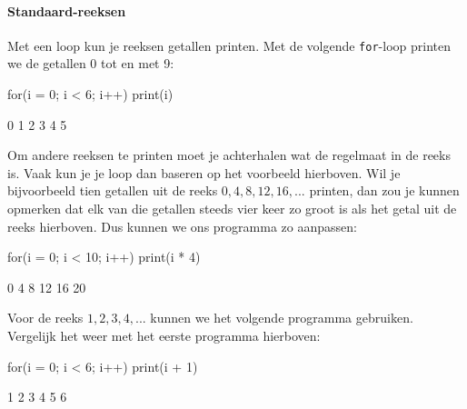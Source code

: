 \paragraph{Standaard-reeksen}

Met een loop kun je reeksen getallen printen. Met de volgende \texttt{for}-loop printen we de getallen 0 tot en met 9:

\begin{minipage}[t]{0.5\textwidth}
\begin{nllisting}
for(i = 0; i < 6; i++)
    print(i)
\end{nllisting}
\end{minipage}%
\begin{minipage}[t]{0.5\textwidth}
\begin{bklisting}
0
1
2
3
4
5
\end{bklisting}
\end{minipage}

Om andere reeksen te printen moet je achterhalen wat de regelmaat in de reeks is. Vaak kun je je loop dan baseren op het voorbeeld hierboven. Wil je bijvoorbeeld tien getallen uit de reeks $0, 4, 8, 12, 16, ...$ printen, dan zou je kunnen opmerken dat elk van die getallen steeds vier keer zo groot is als het getal uit de reeks hierboven. Dus kunnen we ons programma zo aanpassen:

\begin{minipage}[t]{0.5\textwidth}
\begin{nllisting}
for(i = 0; i < 10; i++)
    print(i * 4)
\end{nllisting}
\end{minipage}%
\begin{minipage}[t]{0.5\textwidth}
\begin{bklisting}
0
4
8
12
16
20
\end{bklisting}
\end{minipage}

Voor de reeks $1, 2, 3, 4, ...$ kunnen we het volgende programma gebruiken. Vergelijk het weer met het eerste programma hierboven:

\begin{minipage}[t]{0.5\textwidth}
\begin{nllisting}
for(i = 0; i < 6; i++)
    print(i + 1)
\end{nllisting}
\end{minipage}
\begin{minipage}[t]{0.5\textwidth}
\begin{bklisting}
1
2
3
4
5
6
\end{bklisting}
\end{minipage}


